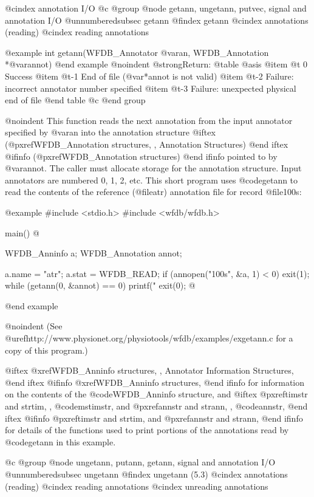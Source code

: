 {{{{{{{{{@cindex annotation I/O
@c @group
@node     getann, ungetann, putvec, signal and annotation I/O
@unnumberedsubsec getann
@findex getann
@cindex annotations (reading)
@cindex reading annotations

@example
int getann(WFDB_Annotator @var{an}, WFDB_Annotation *@var{annot})
@end example
@noindent
@strong{Return:}
@table @asis
@item @t{ 0}
Success
@item @t{-1}
End of file (@var{*annot} is not valid)
@item @t{-2}
Failure: incorrect annotator number specified
@item @t{-3}
Failure: unexpected physical end of file
@end table
@c @end group

@noindent
This function reads the next annotation from the input annotator
specified by @var{an} into the annotation structure
@iftex
(@pxref{WFDB_Annotation structures, , Annotation Structures})
@end iftex
@ifinfo
(@pxref{WFDB_Annotation structures})
@end ifinfo
pointed to by @var{annot}.  The caller must allocate storage for the
annotation structure.  Input annotators are numbered 0, 1, 2, etc.  This
short program uses @code{getann} to read the contents of the reference
(@file{atr}) annotation file for record @file{100s}:

@example
#include <stdio.h>
#include <wfdb/wfdb.h>

main()
@{
    WFDB_Anninfo a;
    WFDB_Annotation annot;

    a.name = "atr"; a.stat = WFDB_READ;
    if (annopen("100s", &a, 1) < 0)
        exit(1);
    while (getann(0, &annot) == 0)
        printf("%
    exit(0);
@}
@end example

@noindent
(See @uref{http://www.physionet.org/physiotools/wfdb/examples/exgetann.c}
for a copy of this program.)

@iftex
@xref{WFDB_Anninfo structures, , Annotator Information Structures},
@end iftex
@ifinfo
@xref{WFDB_Anninfo structures},
@end ifinfo
for information on the contents of the @code{WFDB_Anninfo} structure,
and
@iftex
@pxref{timstr and strtim, , @code{mstimstr}}, and
@pxref{annstr and strann, , @code{annstr}},
@end iftex
@ifinfo
@pxref{timstr and strtim}, and @pxref{annstr and strann},
@end ifinfo
for details of the functions used to print portions of the annotations
read by @code{getann} in this example.

@c @group
@node     ungetann, putann, getann, signal and annotation I/O
@unnumberedsubsec ungetann
@findex ungetann (5.3)
@cindex annotations (reading)
@cindex reading annotations
@cindex unreading annotations

}}}}}}}}}
